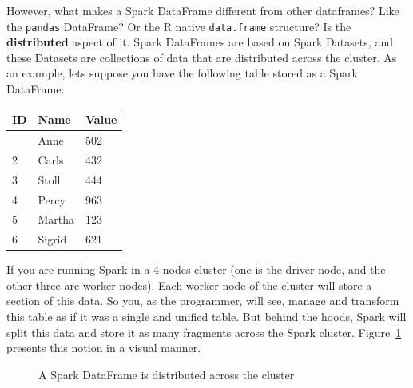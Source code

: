 \documentclass[
  11pt,
  letterpaper,
  DIV=11,
  numbers=noendperiod]{scrreprt}
\begin{document}
However, what makes a Spark DataFrame different from other dataframes?
Like the \texttt{pandas} DataFrame? Or the R native \texttt{data.frame}
structure? Is the \textbf{distributed} aspect of it. Spark DataFrames
are based on Spark Datasets, and these Datasets are collections of data
that are distributed across the cluster. As an example, lets suppose you
have the following table stored as a Spark DataFrame:

\begin{longtable}[]{@{}lll@{}}
\toprule\noalign{}
ID & Name & Value \\
\midrule\noalign{}
\endhead
\bottomrule\noalign{}
\endlastfoot
1 & Anne & 502 \\
2 & Carls & 432 \\
3 & Stoll & 444 \\
4 & Percy & 963 \\
5 & Martha & 123 \\
6 & Sigrid & 621 \\
\end{longtable}

If you are running Spark in a 4 nodes cluster (one is the driver node,
and the other three are worker nodes). Each worker node of the cluster
will store a section of this data. So you, as the programmer, will see,
manage and transform this table as if it was a single and unified table.
But behind the hoods, Spark will split this data and store it as many
fragments across the Spark cluster. Figure~\ref{fig-distributed-df}
presents this notion in a visual manner.

\begin{figure}


\caption{\label{fig-distributed-df}A Spark DataFrame is distributed
across the cluster}

\end{figure}%
\end{document}
